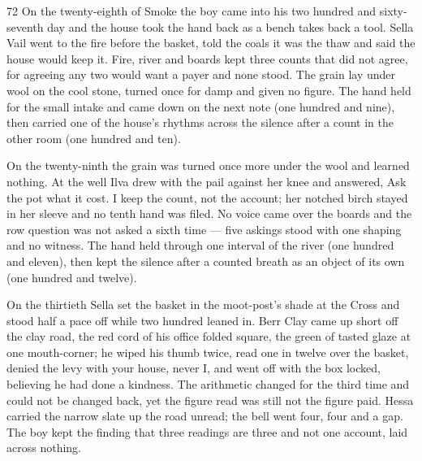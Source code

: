 
\scenebreak


\scenebreak


\scenebreak

\CRtailpiece
\begin{CRchronicle}{72}
On the twenty-eighth of Smoke the boy came into his two hundred and sixty-seventh day and the house took the hand back as a bench takes back a tool. Sella Vail went to the fire before the basket, told the coals it was the thaw and said the house would keep it. Fire, river and boards kept three counts that did not agree, for agreeing any two would want a payer and none stood. The grain lay under wool on the cool stone, turned once for damp and given no figure. The hand held for the small intake and came down on the next note (one hundred and nine), then carried one of the house’s rhythms across the silence after a count in the other room (one hundred and ten).

On the twenty-ninth the grain was turned once more under the wool and learned nothing. At the well Ilva drew with the pail against her knee and answered, Ask the pot what it cost. I keep the count, not the account; her notched birch stayed in her sleeve and no tenth hand was filed. No voice came over the boards and the row question was not asked a sixth time --- five askings stood with one shaping and no witness. The hand held through one interval of the river (one hundred and eleven), then kept the silence after a counted breath as an object of its own (one hundred and twelve).

On the thirtieth Sella set the basket in the moot-post’s shade at the Cross and stood half a pace off while two hundred leaned in. Berr Clay came up short off the clay road, the red cord of his office folded square, the green of tasted glaze at one mouth-corner; he wiped his thumb twice, read one in twelve over the basket, denied the levy with your house, never I, and went off with the box locked, believing he had done a kindness. The arithmetic changed for the third time and could not be changed back, yet the figure read was still not the figure paid. Hessa carried the narrow slate up the road unread; the bell went four, four and a gap. The boy kept the finding that three readings are three and not one account, laid across nothing.


\end{CRchronicle}
